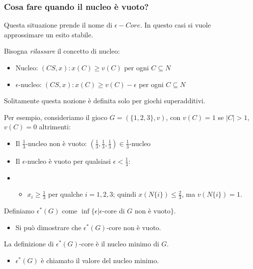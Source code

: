 \subsubsection{Cosa fare quando il nucleo è vuoto?}

Questa situazione prende il nome di $\epsilon-Core$. In questo casi si vuole
approssimare un esito stabile.

Bisogna \textit{rilassare} il concetto di nucleo:

\begin{itemize}
    \item Nucleo: $(CS, x): x(C) \geq v(C)$ per ogni $C \subseteq N$
    \item \(\epsilon\)-nucleo: $(CS, x): x(C) \geq v(C) - \epsilon$ per ogni $C \subseteq N$
\end{itemize}

Solitamente questa nozione è definita solo per giochi superadditivi.

Per esempio, consideriamo il gioco \(G = (\{1, 2, 3\}, v)\), con \(v(C) = 1\)
se \(|C| > 1\), \(v(C) = 0\) altrimenti:
\begin{itemize}
    \item Il \(\frac{1}{3}\)-nucleo non è vuoto: \((\frac{1}{3}, \frac{1}{3},
          \frac{1}{3}) \in \frac{1}{3}\)-nucleo
    \item Il \(\epsilon\)-nucleo è vuoto per qualsiasi \(\epsilon < \frac{1}{3}\):
    \item \begin{itemize}
              \item \(x_i \geq \frac{1}{3}\) per qualche \(i = 1, 2, 3\); quindi \(x(N\{i\}) \leq \frac{2}{3}\), ma \(v(N\{i\}) = 1\).
          \end{itemize}
\end{itemize}

\begin{definition}

    Definiamo $\epsilon^*(G)$ come $\inf \{\epsilon | \epsilon$-core di $G$ non è
    vuoto$\}$.
    \begin{itemize}
        \item Si può dimostrare che $\epsilon^*(G)$-core non è vuoto.
    \end{itemize}
    La definizione di $\epsilon^*(G)$-core è il nucleo minimo di $G$.
    \begin{itemize}
        \item $\epsilon^*(G)$ è chiamato il valore del nucleo minimo.
    \end{itemize}
\end{definition}

